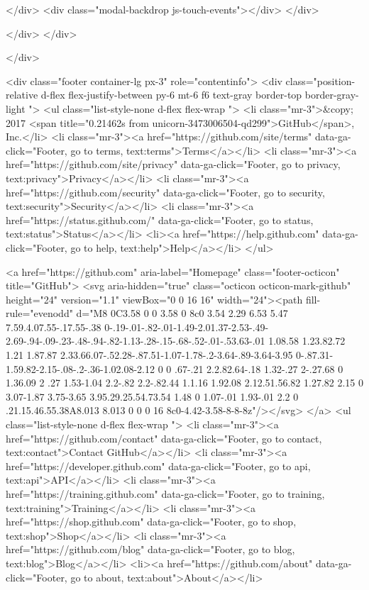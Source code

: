   </div>
  <div class="modal-backdrop js-touch-events"></div>
</div>

    </div>
  </div>

  </div>

      
<div class="footer container-lg px-3" role="contentinfo">
  <div class="position-relative d-flex flex-justify-between py-6 mt-6 f6 text-gray border-top border-gray-light ">
    <ul class="list-style-none d-flex flex-wrap ">
      <li class="mr-3">&copy; 2017 <span title="0.21462s from unicorn-3473006504-qd299">GitHub</span>, Inc.</li>
        <li class="mr-3"><a href="https://github.com/site/terms" data-ga-click="Footer, go to terms, text:terms">Terms</a></li>
        <li class="mr-3"><a href="https://github.com/site/privacy" data-ga-click="Footer, go to privacy, text:privacy">Privacy</a></li>
        <li class="mr-3"><a href="https://github.com/security" data-ga-click="Footer, go to security, text:security">Security</a></li>
        <li class="mr-3"><a href="https://status.github.com/" data-ga-click="Footer, go to status, text:status">Status</a></li>
        <li><a href="https://help.github.com" data-ga-click="Footer, go to help, text:help">Help</a></li>
    </ul>

    <a href="https://github.com" aria-label="Homepage" class="footer-octicon" title="GitHub">
      <svg aria-hidden="true" class="octicon octicon-mark-github" height="24" version="1.1" viewBox="0 0 16 16" width="24"><path fill-rule="evenodd" d="M8 0C3.58 0 0 3.58 0 8c0 3.54 2.29 6.53 5.47 7.59.4.07.55-.17.55-.38 0-.19-.01-.82-.01-1.49-2.01.37-2.53-.49-2.69-.94-.09-.23-.48-.94-.82-1.13-.28-.15-.68-.52-.01-.53.63-.01 1.08.58 1.23.82.72 1.21 1.87.87 2.33.66.07-.52.28-.87.51-1.07-1.78-.2-3.64-.89-3.64-3.95 0-.87.31-1.59.82-2.15-.08-.2-.36-1.02.08-2.12 0 0 .67-.21 2.2.82.64-.18 1.32-.27 2-.27.68 0 1.36.09 2 .27 1.53-1.04 2.2-.82 2.2-.82.44 1.1.16 1.92.08 2.12.51.56.82 1.27.82 2.15 0 3.07-1.87 3.75-3.65 3.95.29.25.54.73.54 1.48 0 1.07-.01 1.93-.01 2.2 0 .21.15.46.55.38A8.013 8.013 0 0 0 16 8c0-4.42-3.58-8-8-8z"/></svg>
</a>
    <ul class="list-style-none d-flex flex-wrap ">
        <li class="mr-3"><a href="https://github.com/contact" data-ga-click="Footer, go to contact, text:contact">Contact GitHub</a></li>
      <li class="mr-3"><a href="https://developer.github.com" data-ga-click="Footer, go to api, text:api">API</a></li>
      <li class="mr-3"><a href="https://training.github.com" data-ga-click="Footer, go to training, text:training">Training</a></li>
      <li class="mr-3"><a href="https://shop.github.com" data-ga-click="Footer, go to shop, text:shop">Shop</a></li>
        <li class="mr-3"><a href="https://github.com/blog" data-ga-click="Footer, go to blog, text:blog">Blog</a></li>
        <li><a href="https://github.com/about" data-ga-click="Footer, go to about, text:about">About</a></li>

